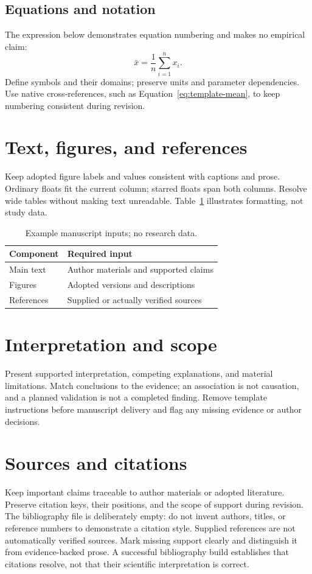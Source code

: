 \subsection{Equations and notation}
The expression below demonstrates equation numbering and makes no empirical
claim:
\begin{equation}
  \bar{x} = \frac{1}{n}\sum_{i=1}^{n} x_i .
  \label{eq:template-mean}
\end{equation}
Define symbols and their domains; preserve units and parameter dependencies.
Use native cross-references, such as Equation~\eqref{eq:template-mean}, to keep
numbering consistent during revision.

\section{Text, figures, and references}
Keep adopted figure labels and values consistent with captions and prose.
Ordinary floats fit the current column; starred floats span both columns.
Resolve wide tables without making text unreadable.
Table~\ref{tab:template-inputs} illustrates formatting, not study data.

\begin{table}[bp]
  \centering
  \caption{Example manuscript inputs; no research data.}
  \label{tab:template-inputs}
  \small
  \begin{tabularx}{\linewidth}{@{}lX@{}}
    \toprule
    Component & Required input \\
    \midrule
    Main text & Author materials and supported claims \\
    Figures & Adopted versions and descriptions \\
    References & Supplied or actually verified sources \\
    \bottomrule
  \end{tabularx}
\end{table}

\section{Interpretation and scope}
Present supported interpretation, competing explanations, and material
limitations. Match conclusions to the evidence; an association is not
causation, and a planned validation is not a completed finding. Remove
template instructions before manuscript delivery and flag any missing
evidence or author decisions.

\section{Sources and citations}
Keep important claims traceable to author materials or adopted literature.
Preserve citation keys, their positions, and the scope of support during
revision. The bibliography file is deliberately empty: do not invent authors,
titles, or reference numbers to demonstrate a citation style. Supplied
references are not automatically verified sources. Mark missing support
clearly and distinguish it from evidence-backed prose. A successful
bibliography build establishes that citations resolve, not that their
scientific interpretation is correct.

